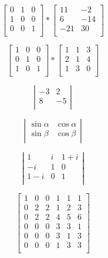 \documentclass[12pt, letterpaper, titlepage]{article}
\begin{document}
\begin{center}
$$
\mathbf{}
\left[ \begin{array}{ccc}
0 & 1 & 0 \\
1 & 0 & 0 \\
0 & 0 & 1 \\
\end{array} 
\right]
*
\mathbf{}
\left[ \begin{array}{cc}
11 & -2 \\
6 & -14 \\
-21 & 30 \\
\end{array} 
\right]$$

$$
\mathbf{}
\left[ \begin{array}{ccc}
1 & 0 & 0 \\
0 & 1 & 0 \\
1 & 0 & 1 \\
\end{array} 
\right]
*
\mathbf{}
\left[ \begin{array}{ccc}
1 & 1 & 3 \\
2 & 1 & 4 \\
1 & 3 & 0 \\
\end{array} 
\right]$$

$$\mathbf{}
\left| \begin{array}{rr}
-3 & 2 \\
8 & -5 \\
\end{array} 
\right|$$

$$\mathbf{}
\left| \begin{array}{rr}
\sin\alpha & \cos\alpha \\
\sin\beta & \cos\beta \\
\end{array} 
\right|$$

$$\mathbf{}
\left| \begin{array}{ccc}
1 & i & 1+i \\
-i & 1 & 0 \\
1-i & 0 & 1	 \\
\end{array} 
\right|$$

$$\left[
\begin{array}{c|cc|ccc}
1& 0& 0& 1& 1& 1 \\
\hline
0& 2& 2& 1& 2& 3 \\
0& 2& 2& 4& 5& 6 \\
\hline
0& 0& 0& 3& 3& 1\\
0& 0& 0& 3& 1& 3\\
0& 0& 0& 1& 3& 3\\
\end{array}
\right]
$$


\end{center}
\end{document}
